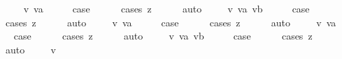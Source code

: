 \begin{isabellebody}
\ \ \isamarkupfalse%
\ {\isacharparenleft}{\isachardoublequoteopen}{}{}{\isacharunderscore}{}{\isachardoublequoteclose}\ v\ va{\isacharparenright}\isanewline
\ \ \isamarkupfalse%
\ \isamarkupfalse%
\ {\isacharquery}case\isanewline
\ \ \ \ \isamarkupfalse%
\ {\isacharparenleft}cases\ z{\isacharparenright}\isanewline
\ \ \ \ \isamarkupfalse%
\ auto\isanewline
{}\isamarkupfalse%
\isanewline
\ \ \isamarkupfalse%
\ {\isacharparenleft}{\isachardoublequoteopen}{}{}{\isacharunderscore}{}{\isachardoublequoteclose}\ v\ va\ vb{\isacharparenright}\isanewline
\ \ \isamarkupfalse%
\ \isamarkupfalse%
\ {\isacharquery}case\isanewline
\ \ \ \ \isamarkupfalse%
\ {\isacharparenleft}cases\ z{\isacharparenright}\isanewline
\ \ \ \ \isamarkupfalse%
\ auto\isanewline
{}\isamarkupfalse%
\isanewline
\ \ \isamarkupfalse%
\ {\isacharparenleft}{}{}\ v\ va{\isacharparenright}\isanewline
\ \ \isamarkupfalse%
\ \isamarkupfalse%
\ {\isacharquery}case\isanewline
\ \ \ \ \isamarkupfalse%
\ {\isacharparenleft}cases\ z{\isacharparenright}\isanewline
\ \ \ \ \isamarkupfalse%
\ auto\isanewline
{}\isamarkupfalse%
\isanewline
\ \ \isamarkupfalse%
\ {\isacharparenleft}{}{}\ v\ va{\isacharparenright}\isanewline
\ \ \isamarkupfalse%
\ \isamarkupfalse%
\ {\isacharquery}case\isanewline
\ \ \ \ \isamarkupfalse%
\ {\isacharparenleft}cases\ z{\isacharparenright}\isanewline
\ \ \ \ \isamarkupfalse%
\ auto\isanewline
{}\isamarkupfalse%
\isanewline
\ \ \isamarkupfalse%
\ {\isacharparenleft}{}{}\ v\ va\ vb{\isacharparenright}\isanewline
\ \ \isamarkupfalse%
\ \isamarkupfalse%
\ {\isacharquery}case\isanewline
\ \ \ \ \isamarkupfalse%
\ {\isacharparenleft}cases\ z{\isacharparenright}\isanewline
\ \ \ \ \isamarkupfalse%
\ auto\isanewline
{}\isamarkupfalse%
\isanewline
\ \ \isamarkupfalse%
\ {\isacharparenleft}{\isachardoublequoteopen}{}{}{\isacharunderscore}{}{\isachardoublequoteclose}\ v{\isacharparenright}\isanewline
\ \ \isamarkupfalse%

\end{isabellebody}
